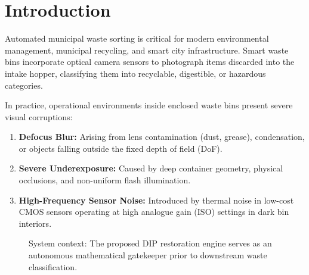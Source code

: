 \documentclass[conference]{IEEEtran}
\begin{document}
\section{Introduction}
Automated municipal waste sorting is critical for modern environmental management, municipal recycling, and smart city infrastructure. Smart waste bins incorporate optical camera sensors to photograph items discarded into the intake hopper, classifying them into recyclable, digestible, or hazardous categories. 

In practice, operational environments inside enclosed waste bins present severe visual corruptions:
\begin{enumerate}
    \item \textbf{Defocus Blur:} Arising from lens contamination (dust, grease), condensation, or objects falling outside the fixed depth of field (DoF).
    \item \textbf{Severe Underexposure:} Caused by deep container geometry, physical occlusions, and non-uniform flash illumination.
    \item \textbf{High-Frequency Sensor Noise:} Introduced by thermal noise in low-cost CMOS sensors operating at high analogue gain (ISO) settings in dark bin interiors.
\end{enumerate}

\begin{figure}[htbp]
\centering
{}
\caption{System context: The proposed DIP restoration engine serves as an autonomous mathematical gatekeeper prior to downstream waste classification.}
\label{fig:system_context}
\end{figure}
\end{document}
